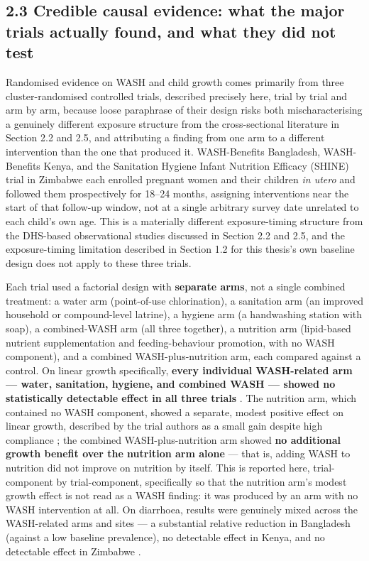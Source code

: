 \subsection*{2.3 Credible causal evidence: what the major trials actually found, and what they did not test}

Randomised evidence on WASH and child growth comes primarily from three cluster-randomised controlled trials, described precisely here, trial by trial and arm by arm, because loose paraphrase of their design risks both mischaracterising a genuinely different exposure structure from the cross-sectional literature in Section 2.2 and 2.5, and attributing a finding from one arm to a different intervention than the one that produced it. WASH-Benefits Bangladesh, WASH-Benefits Kenya, and the Sanitation Hygiene Infant Nutrition Efficacy (SHINE) trial in Zimbabwe each enrolled pregnant women and their children \textit{in utero} and followed them prospectively for 18--24 months, assigning interventions near the start of that follow-up window, not at a single arbitrary survey date unrelated to each child's own age. This is a materially different exposure-timing structure from the DHS-based observational studies discussed in Section 2.2 and 2.5, and the exposure-timing limitation described in Section 1.2 for this thesis's own baseline design does not apply to these three trials.

Each trial used a factorial design with \textbf{separate arms}, not a single combined treatment: a water arm (point-of-use chlorination), a sanitation arm (an improved household or compound-level latrine), a hygiene arm (a handwashing station with soap), a combined-WASH arm (all three together), a nutrition arm (lipid-based nutrient supplementation and feeding-behaviour promotion, with no WASH component), and a combined WASH-plus-nutrition arm, each compared against a control. On linear growth specifically, \textbf{every individual WASH-related arm --- water, sanitation, hygiene, and combined WASH --- showed no statistically detectable effect in all three trials} \parencite[pp. 2, 5 and Fig. 2]{Cumming2019}. The nutrition arm, which contained no WASH component, showed a separate, modest positive effect on linear growth, described by the trial authors as a small gain despite high compliance \parencite[p. 6]{Cumming2019}; the combined WASH-plus-nutrition arm showed \textbf{no additional growth benefit over the nutrition arm alone} \parencite[p. 2]{Cumming2019} --- that is, adding WASH to nutrition did not improve on nutrition by itself. This is reported here, trial-component by trial-component, specifically so that the nutrition arm's modest growth effect is not read as a WASH finding: it was produced by an arm with no WASH intervention at all. On diarrhoea, results were genuinely mixed across the WASH-related arms and sites --- a substantial relative reduction in Bangladesh (against a low baseline prevalence), no detectable effect in Kenya, and no detectable effect in Zimbabwe \parencite[pp. 2--5, Fig. 2]{Cumming2019}.

